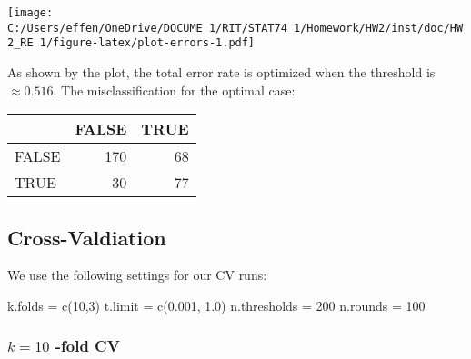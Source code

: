 \documentclass[
  11pt,
  a4paper,
]{scrartcl}
\newenvironment{Shaded}{\begin{snugshade}}{\end{snugshade}}
\newcommand{\DecValTok}[1]{\textcolor[rgb]{0.00,0.00,0.81}{#1}}
\newcommand{\FloatTok}[1]{\textcolor[rgb]{0.00,0.00,0.81}{#1}}
\newcommand{\FunctionTok}[1]{\textcolor[rgb]{0.00,0.00,0.00}{#1}}
\newcommand{\NormalTok}[1]{#1}
\newcommand{\OtherTok}[1]{\textcolor[rgb]{0.56,0.35,0.01}{#1}}
\newcommand{\SpecialCharTok}[1]{\textcolor[rgb]{0.00,0.00,0.00}{#1}}
\newcommand{\StringTok}[1]{\textcolor[rgb]{0.31,0.60,0.02}{#1}}
\begin{document}
\texttt{[image: C:/Users/effen/OneDrive/DOCUME~1/RIT/STAT74~1/Homework/HW2/inst/doc/HW2\_RE~1/figure-latex/plot-errors-1.pdf]}

As shown by the plot, the total error rate is optimized when the
threshold is \(\approx 0.516\). The misclassification for the optimal
case:

\begin{Shaded}
\end{Shaded}

\begin{longtable}[]{@{}lrr@{}}
\toprule
& FALSE & TRUE \\
\midrule
\endhead
FALSE & 170 & 68 \\
TRUE & 30 & 77 \\
\bottomrule
\end{longtable}

\hypertarget{cross-valdiation}{%
\subsection{Cross-Valdiation}\label{cross-valdiation}}

We use the following settings for our CV runs:

\begin{Shaded}
\begin{Highlighting}[]
\NormalTok{k.folds }\OtherTok{=} \FunctionTok{c}\NormalTok{(}\DecValTok{10}\NormalTok{,}\DecValTok{3}\NormalTok{)}
\NormalTok{t.limit }\OtherTok{=} \FunctionTok{c}\NormalTok{(}\FloatTok{0.001}\NormalTok{, }\FloatTok{1.0}\NormalTok{)}
\NormalTok{n.thresholds }\OtherTok{=} \DecValTok{200}
\NormalTok{n.rounds }\OtherTok{=} \DecValTok{100}
\end{Highlighting}
\end{Shaded}

\hypertarget{k-10--fold-cv}{%
\subsubsection{\texorpdfstring{\(k = 10\) -fold
CV}{k = 10 -fold CV}}\label{k-10--fold-cv}}
\end{document}
